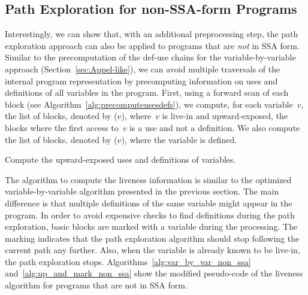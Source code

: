 \subsection{Path Exploration for non-SSA-form Programs}
\label{sec:path-explore:non_ssa}

Interestingly, we can show that, with an additional preprocessing step, the path exploration approach can also be applied to programs that are \emph{not} in SSA form.
Similar to the precomputation of the def-use chains for the variable-by-variable approach (Section~\ref{sec:Appel-like}), we can avoid multiple traversals of the internal program representation by precomputing information on uses and definitions of all variables in the program.
First, using a forward scan of each block (see Algorithm~\ref{alg:precomputeusesdefs}), we compute, for each variable~$v$, the list of blocks, denoted by \UpExp($v$), where~$v$ is live-in and upward-exposed, \ie the blocks where the first access to~$v$ is a use and not a definition.
We also compute the list of blocks, denoted by \Kill($v$), where the variable is defined.

\begin{algorithm}[H]
  \caption{Compute the upward-exposed uses and definitions of variables.}
  \label{alg:precomputeusesdefs}
\end{algorithm}

The algorithm to compute the liveness information is similar to the optimized variable-by-variable algorithm presented in the previous section.
The main difference is that multiple definitions of the same variable might appear in the program.
In order to avoid expensive checks to find definitions during the path exploration, basic blocks are marked with a variable during the processing.
The marking indicates that the path exploration algorithm should stop following the current path any further.
Also, when the variable is already known to be live-in, the path exploration stops.
Algorithms~\ref{alg:var_by_var_non_ssa} and~\ref{alg:up_and_mark_non_ssa} show the modified pseudo-code of the liveness algorithm for programs that are not in SSA form.

